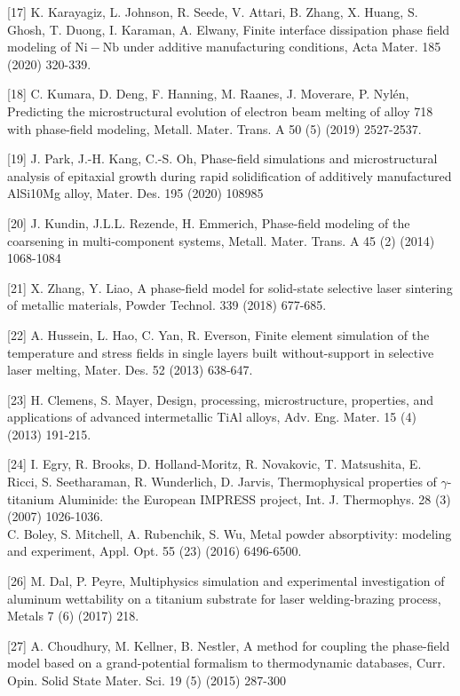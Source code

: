 \documentclass[10pt]{article}
\begin{document}
[17] K. Karayagiz, L. Johnson, R. Seede, V. Attari, B. Zhang, X. Huang, S. Ghosh, T. Duong, I. Karaman, A. Elwany, Finite interface dissipation phase field modeling of $\mathrm{Ni}-\mathrm{Nb}$ under additive manufacturing conditions, Acta Mater. 185 (2020) 320-339.

[18] C. Kumara, D. Deng, F. Hanning, M. Raanes, J. Moverare, P. Nylén, Predicting the microstructural evolution of electron beam melting of alloy 718 with phase-field modeling, Metall. Mater. Trans. A 50 (5) (2019) 2527-2537.

[19] J. Park, J.-H. Kang, C.-S. Oh, Phase-field simulations and microstructural analysis of epitaxial growth during rapid solidification of additively manufactured AlSi10Mg alloy, Mater. Des. 195 (2020) 108985

[20] J. Kundin, J.L.L. Rezende, H. Emmerich, Phase-field modeling of the coarsening in multi-component systems, Metall. Mater. Trans. A 45 (2) (2014) 1068-1084

[21] X. Zhang, Y. Liao, A phase-field model for solid-state selective laser sintering of metallic materials, Powder Technol. 339 (2018) 677-685.

[22] A. Hussein, L. Hao, C. Yan, R. Everson, Finite element simulation of the temperature and stress fields in single layers built without-support in selective laser melting, Mater. Des. 52 (2013) 638-647.

[23] H. Clemens, S. Mayer, Design, processing, microstructure, properties, and applications of advanced intermetallic TiAl alloys, Adv. Eng. Mater. 15 (4) (2013) 191-215.

[24] I. Egry, R. Brooks, D. Holland-Moritz, R. Novakovic, T. Matsushita, E. Ricci, S. Seetharaman, R. Wunderlich, D. Jarvis, Thermophysical properties of $\gamma$-titanium Aluminide: the European IMPRESS project, Int. J. Thermophys. 28 (3) (2007) 1026-1036.\\
[25] C. Boley, S. Mitchell, A. Rubenchik, S. Wu, Metal powder absorptivity: modeling and experiment, Appl. Opt. 55 (23) (2016) 6496-6500.

[26] M. Dal, P. Peyre, Multiphysics simulation and experimental investigation of aluminum wettability on a titanium substrate for laser welding-brazing process, Metals 7 (6) (2017) 218.

[27] A. Choudhury, M. Kellner, B. Nestler, A method for coupling the phase-field model based on a grand-potential formalism to thermodynamic databases, Curr. Opin. Solid State Mater. Sci. 19 (5) (2015) 287-300
\end{document}
